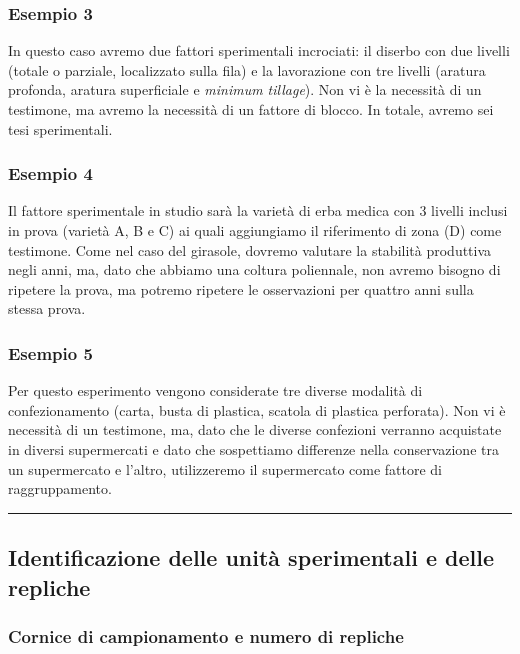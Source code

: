 \documentclass[a4paper,12pt,oneside]{book}
\begin{document}
\subsubsection{Esempio 3}\label{esempio-3}

In questo caso avremo due fattori sperimentali incrociati: il diserbo
con due livelli (totale o parziale, localizzato sulla fila) e la
lavorazione con tre livelli (aratura profonda, aratura superficiale e
\emph{minimum tillage}). Non vi è la necessità di un testimone, ma
avremo la necessità di un fattore di blocco. In totale, avremo sei tesi
sperimentali.

\subsubsection{Esempio 4}\label{esempio-4}

Il fattore sperimentale in studio sarà la varietà di erba medica con 3
livelli inclusi in prova (varietà A, B e C) ai quali aggiungiamo il
riferimento di zona (D) come testimone. Come nel caso del girasole,
dovremo valutare la stabilità produttiva negli anni, ma, dato che
abbiamo una coltura poliennale, non avremo bisogno di ripetere la prova,
ma potremo ripetere le osservazioni per quattro anni sulla stessa prova.

\subsubsection{Esempio 5}\label{esempio-5}

Per questo esperimento vengono considerate tre diverse modalità di
confezionamento (carta, busta di plastica, scatola di plastica
perforata). Non vi è necessità di un testimone, ma, dato che le diverse
confezioni verranno acquistate in diversi supermercati e dato che
sospettiamo differenze nella conservazione tra un supermercato e
l'altro, utilizzeremo il supermercato come fattore di raggruppamento.

\begin{center}\rule{0.5\linewidth}{\linethickness}\end{center}

\subsection{Identificazione delle unità sperimentali e delle
repliche}\label{identificazione-delle-unita-sperimentali-e-delle-repliche}

\subsubsection{Cornice di campionamento e numero di
repliche}\label{cornice-di-campionamento-e-numero-di-repliche}
\end{document}
